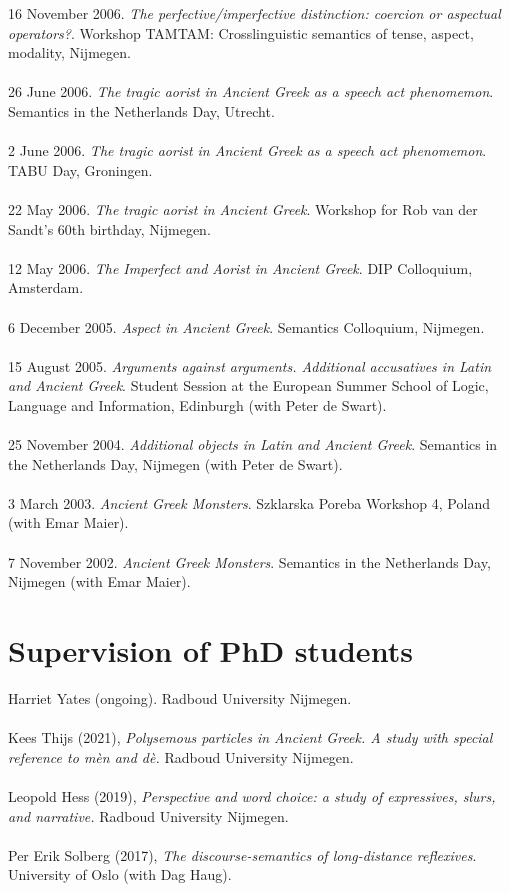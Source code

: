 \documentclass[a4paper,11pt]{article}
\begin{document}
16 November 2006. \emph{The perfective/imperfective distinction: coercion or aspectual operators?}. Workshop TAMTAM: Crosslinguistic semantics of tense, aspect, modality, Nijmegen.\\\\
26 June 2006. \emph{The tragic aorist in Ancient Greek as a speech act phenomemon}. Semantics in the Netherlands Day, Utrecht.\\\\
2 June 2006. \emph{The tragic aorist in Ancient Greek as a speech act phenomemon}. TABU Day, Groningen.\\\\
22 May 2006. \emph{The tragic aorist in Ancient Greek}. Workshop for Rob van der Sandt's 60th birthday, Nijmegen.\\\\
12 May 2006. \emph{The Imperfect and Aorist in Ancient Greek}. DIP Colloquium, Amsterdam.\\\\
6 December 2005. \emph{Aspect in Ancient Greek}. Semantics Colloquium, Nijmegen.\\\\
15 August 2005. \emph{Arguments against arguments. Additional
accusatives in Latin and Ancient Greek}. Student Session at the
European Summer School of Logic, Language and Information,
Edinburgh (with Peter de Swart).\\\\
25 November 2004. \emph{Additional objects in Latin and Ancient
Greek}. Semantics in the Netherlands Day, Nijmegen (with Peter de Swart).\\\\
3 March 2003. \emph{Ancient Greek Monsters}. Szklarska
Poreba Workshop 4, Poland (with Emar Maier).\\\\
7 November 2002. \emph{Ancient Greek Monsters}. Semantics in the Netherlands Day, Nijmegen (with Emar
Maier).\\



\section*{Supervision of PhD students}

Harriet Yates (ongoing). Radboud University Nijmegen.\\\\  
Kees Thijs (2021), \emph{Polysemous particles in Ancient Greek. A study with special reference to \emph{m\`en} and \emph{d\`e}.} Radboud University Nijmegen.\\\\
Leopold Hess (2019), \emph{Perspective and word choice: a study of expressives, slurs, and narrative.} Radboud University Nijmegen.\\\\
Per Erik Solberg (2017), \emph{The discourse-semantics of long-distance reflexives}. University of Oslo (with Dag Haug).
\end{document}
